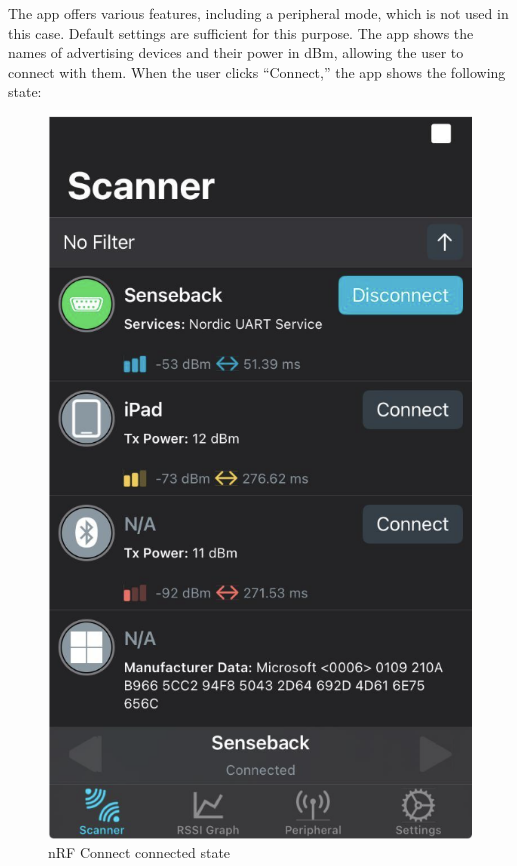\documentclass{Configuration_Files/PoliMi3i_thesis}
\begin{document}
The app offers various features, including a peripheral mode, which is not used in this case. Default settings are sufficient for this purpose. The app shows the names of advertising devices and their power in dBm, allowing the user to connect with them. When the user clicks “Connect,” the app shows the following state:

\begin{figure}[H]
    \centering
    \includegraphics[scale=0.6]{Multicentral/7.png}
    \caption{nRF Connect connected state}
    \label{multicentral_7}
\end{figure}
\end{document}
